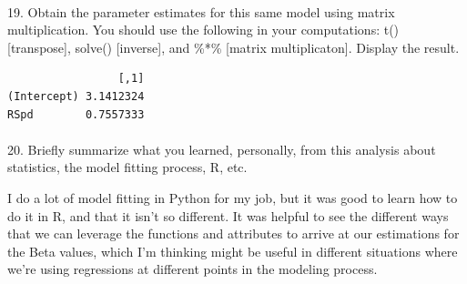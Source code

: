\documentclass[
  letterpaper,
  DIV=11,
  numbers=noendperiod]{scrartcl}
\makeatletter
\let\oldparagraph\paragraph
\renewcommand{\paragraph}{
    \@ifstar
      \xxxParagraphStar
      \xxxParagraphNoStar
  }
\newcommand{\xxxParagraphStar}[1]{\oldparagraph*{#1}\mbox{}}
\newcommand{\xxxParagraphNoStar}[1]{\oldparagraph{#1}\mbox{}}
\newenvironment{Shaded}{\begin{snugshade}}{\end{snugshade}}
\newcommand{\FunctionTok}[1]{\textcolor[rgb]{0.28,0.35,0.67}{#1}}
\newcommand{\NormalTok}[1]{\textcolor[rgb]{0.00,0.23,0.31}{#1}}
\newcommand{\OtherTok}[1]{\textcolor[rgb]{0.00,0.23,0.31}{#1}}
\newcommand{\SpecialCharTok}[1]{\textcolor[rgb]{0.37,0.37,0.37}{#1}}
\makeatother
\begin{document}
\paragraph{19. Obtain the parameter estimates for this same model using
matrix multiplication. You should use the following in your
computations: t() {[}transpose{]}, solve() {[}inverse{]}, and \%*\%
{[}matrix multiplicaton{]}. Display the
result.}\label{obtain-the-parameter-estimates-for-this-same-model-using-matrix-multiplication.-you-should-use-the-following-in-your-computations-t-transpose-solve-inverse-and-matrix-multiplicaton.-display-the-result.}

\begin{Shaded}
\end{Shaded}

\begin{verbatim}
                 [,1]
(Intercept) 3.1412324
RSpd        0.7557333
\end{verbatim}

\paragraph{20. Briefly summarize what you learned, personally, from this
analysis about statistics, the model fitting process, R,
etc.}\label{briefly-summarize-what-you-learned-personally-from-this-analysis-about-statistics-the-model-fitting-process-r-etc.}

I do a lot of model fitting in Python for my job, but it was good to
learn how to do it in R, and that it isn't so different. It was helpful
to see the different ways that we can leverage the functions and
attributes to arrive at our estimations for the Beta values, which I'm
thinking might be useful in different situations where we're using
regressions at different points in the modeling process.
\end{document}
